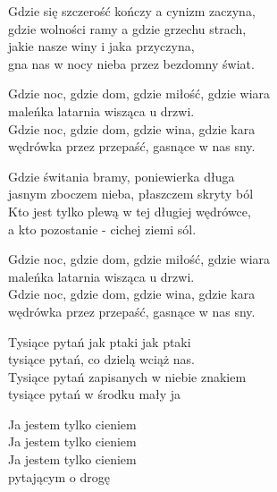 \begin{text}
    Gdzie się szczerość kończy a cynizm zaczyna,\\
    gdzie wolności ramy a gdzie grzechu strach,\\
    jakie nasze winy i jaka przyczyna,\\
    gna nas w nocy nieba przez bezdomny świat.

    Gdzie noc, gdzie dom, gdzie miłość, gdzie wiara\\
    maleńka latarnia wisząca u drzwi.\\
    Gdzie noc, gdzie dom, gdzie wina, gdzie kara\\
    wędrówka przez przepaść, gasnące w nas sny.

    Gdzie świtania bramy, poniewierka długa\\
    jasnym zboczem nieba, płaszczem skryty ból\\
    Kto jest tylko plewą w tej długiej wędrówce,\\
    a kto pozostanie - cichej ziemi sól.

    Gdzie noc, gdzie dom, gdzie miłość, gdzie wiara\\
    maleńka latarnia wisząca u drzwi.\\
    Gdzie noc, gdzie dom, gdzie wina, gdzie kara\\
    wędrówka przez przepaść, gasnące w nas sny.

    Tysiące pytań jak ptaki jak ptaki\\
    tysiące pytań, co dzielą wciąż nas.\\
    Tysiące pytań zapisanych w niebie znakiem\\
    tysiące pytań w środku mały ja

    Ja jestem tylko cieniem\\
    Ja jestem tylko cieniem\\
    Ja jestem tylko cieniem\\
    pytającym o drogę
\end{text}
\begin{chord}

\end{chord}